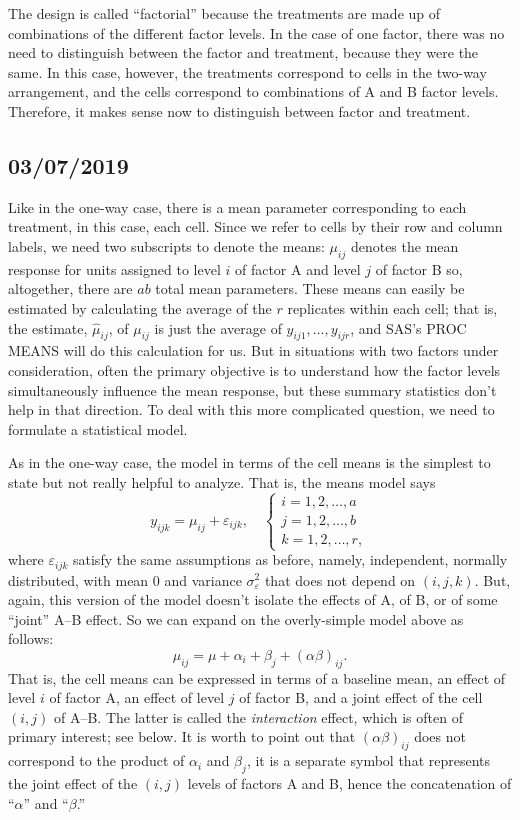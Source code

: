 \documentclass[a4paper, 12pt]{article}
\theoremstyle{plain}
\theoremstyle{definition}
\theoremstyle{remark}
\newcommand{\eps}{\varepsilon}
\begin{document}
The design is called ``factorial'' because the treatments are made up of combinations of the different factor levels.  In the case of one factor, there was no need to distinguish between the factor and treatment, because they were the same.  In this case, however, the treatments correspond to cells in the two-way arrangement, and the cells correspond to combinations of A and B factor levels.  Therefore, it makes sense now to distinguish between factor and treatment.  


\subsection*{03/07/2019}

Like in the one-way case, there is a mean parameter corresponding to each treatment, in this case, each cell.  Since we refer to cells by their row and column labels, we need two subscripts to denote the means: $\mu_{ij}$ denotes the mean response for units assigned to level $i$ of factor A and level $j$ of factor B so, altogether, there are $ab$ total mean parameters.  These means can easily be estimated by calculating the average of the $r$ replicates within each cell; that is, the estimate, $\hat\mu_{ij}$, of $\mu_{ij}$ is just the average of $y_{ij1},\ldots,y_{ijr}$, and SAS's PROC MEANS will do this calculation for us.  But in situations with two factors under consideration, often the primary objective is to understand how the factor levels simultaneously influence the mean response, but these summary statistics don't help in that direction.  To deal with this more complicated question, we need to formulate a statistical model.  

As in the one-way case, the model in terms of the cell means is the simplest to state but not really helpful to analyze.  That is, the means model says 
\[ y_{ijk} = \mu_{ij} + \eps_{ijk}, \quad \begin{cases} i=1,2,\ldots,a \\ j = 1,2,\ldots,b \\ k=1,2,\ldots,r, \end{cases} \]
where $\eps_{ijk}$ satisfy the same assumptions as before, namely, independent, normally distributed, with mean 0 and variance $\sigma_\eps^2$ that does not depend on $(i,j,k)$.  But, again, this version of the model doesn't isolate the effects of A, of B, or of some ``joint'' A--B effect.  So we can expand on the overly-simple model above as follows:
\[ \mu_{ij} = \mu + \alpha_i + \beta_j + (\alpha\beta)_{ij}. \]
That is, the cell means can be expressed in terms of a baseline mean, an effect of level $i$ of factor A, an effect of level $j$ of factor B, and a joint effect of the cell $(i,j)$ of A--B.  The latter is called the {\em interaction} effect, which is often of primary interest; see below.  It is worth to point out that $(\alpha\beta)_{ij}$ does not correspond to the product of $\alpha_i$ and $\beta_j$, it is a separate symbol that represents the joint effect of the $(i,j)$ levels of factors A and B, hence the concatenation of ``$\alpha$'' and ``$\beta$.''  
\end{document}
